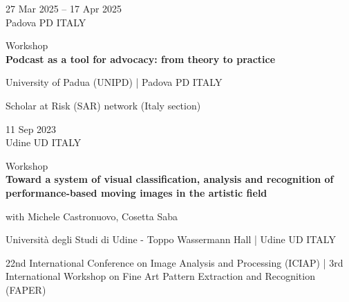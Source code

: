 \documentclass[7pt,a4paper]{article}
\begin{document}
\begin{mdframed}[
    backgroundcolor=entrygray,
    linecolor=entrygray,
    linewidth=0pt,
    innerleftmargin=6pt,
    innerrightmargin=6pt,
    innertopmargin=6pt,
    innerbottommargin=6pt,
    skipabove=0pt,
    skipbelow=0pt
]

\begin{minipage}[t]{0.28\textwidth}

27 Mar 2025 – 17 Apr 2025
\\\scriptsize Padova PD ITALY

\end{minipage}
\begin{minipage}[t]{0.68\textwidth}
\small Workshop
\\\normalsize \textbf{Podcast as a tool for advocacy: from theory to practice}

\par \small University of Padua (UNIPD) | \scriptsize Padova PD ITALY
\vspace{0.1cm}
\par \scriptsize Scholar at Risk (SAR) network (Italy section)
\end{minipage}
\vspace{0.25cm}
\end{mdframed}


\begin{mdframed}[
    backgroundcolor=white,
    linecolor=white,
    linewidth=0pt,
    innerleftmargin=6pt,
    innerrightmargin=6pt,
    innertopmargin=6pt,
    innerbottommargin=6pt,
    skipabove=0pt,
    skipbelow=0pt
]

\begin{minipage}[t]{0.28\textwidth}

11 Sep 2023
\\\scriptsize Udine UD ITALY

\end{minipage}
\begin{minipage}[t]{0.68\textwidth}
\small Workshop
\\\normalsize \textbf{Toward a system of visual classification, analysis and recognition of performance-based moving images in the artistic field}
\par \scriptsize with Michele Castronuovo, Cosetta Saba
\par \small Università degli Studi di Udine - Toppo Wassermann Hall | \scriptsize Udine UD ITALY
\vspace{0.1cm}
\par \scriptsize 22nd International Conference on Image Analysis and Processing (ICIAP) | 3rd International Workshop on Fine Art Pattern Extraction and Recognition (FAPER)
\end{minipage}
\vspace{0.25cm}
\end{mdframed}
\end{document}
